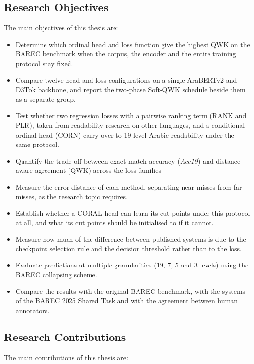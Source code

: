 \subsection{Research Objectives}
The main objectives of this thesis are:
\begin{itemize}

\item Determine which ordinal head and loss function give the highest QWK on the BAREC benchmark when the corpus, the encoder and the entire training protocol stay fixed.
\item Compare twelve head and loss configurations on a single AraBERTv2 and D3Tok backbone, and report the two-phase Soft-QWK schedule beside them as a separate group.

\item Test whether two regression losses with a pairwise ranking term (RANK and PLR), taken from readability research on other languages, and a conditional ordinal head (CORN) carry over to 19-level Arabic readability under the same protocol.

\item Quantify the trade off between exact-match accuracy (\textit{Acc19}) and distance aware agreement (QWK) across the loss families.

\item Measure the error distance of each method, separating near misses from far misses, as the research topic requires.

\item Establish whether a CORAL head can learn its cut points under this protocol at all, and what its cut points should be initialised to if it cannot.

\item Measure how much of the difference between published systems is due to the checkpoint selection rule and the decision threshold rather than to the loss.

\item Evaluate predictions at multiple granularities ($19$, $7$, $5$ and $3$ levels) using the BAREC collapsing scheme.

\item Compare the results with the original BAREC benchmark, with the systems of the BAREC 2025 Shared Task and with the agreement between human annotators.

\end{itemize}



\subsection{Research Contributions}
The main contributions of this thesis are:

